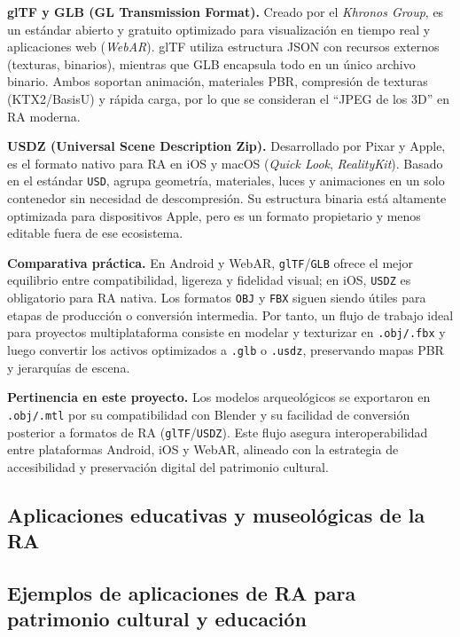 \textbf{glTF y GLB (GL Transmission Format).} Creado por el \emph{Khronos Group}, es un estándar abierto y gratuito optimizado para visualización en tiempo real y aplicaciones web (\emph{WebAR}). glTF utiliza estructura JSON con recursos externos (texturas, binarios), mientras que GLB encapsula todo en un único archivo binario. Ambos soportan animación, materiales \gls{PBR}, compresión de texturas (KTX2/BasisU) y rápida carga, por lo que se consideran el “JPEG de los 3D” en RA moderna.

\textbf{USDZ (Universal Scene Description Zip).} Desarrollado por Pixar y Apple, es el formato nativo para RA en iOS y macOS (\emph{Quick Look}, \emph{RealityKit}). Basado en el estándar \texttt{USD}, agrupa geometría, materiales, luces y animaciones en un solo contenedor sin necesidad de descompresión. Su estructura binaria está altamente optimizada para dispositivos Apple, pero es un formato propietario y menos editable fuera de ese ecosistema.

\textbf{Comparativa práctica.} En Android y WebAR, \texttt{glTF}/\texttt{GLB} ofrece el mejor equilibrio entre compatibilidad, ligereza y fidelidad visual; en iOS, \texttt{USDZ} es obligatorio para RA nativa. Los formatos \texttt{OBJ} y \texttt{FBX} siguen siendo útiles para etapas de producción o conversión intermedia. Por tanto, un flujo de trabajo ideal para proyectos multiplataforma consiste en modelar y texturizar en \texttt{.obj/.fbx} y luego convertir los activos optimizados a \texttt{.glb} o \texttt{.usdz}, preservando mapas \gls{PBR} y jerarquías de escena.

\textbf{Pertinencia en este proyecto.} Los modelos arqueológicos se exportaron en \texttt{.obj/.mtl} por su compatibilidad con Blender y su facilidad de conversión posterior a formatos de RA (\texttt{glTF}/\texttt{USDZ}). Este flujo asegura interoperabilidad entre plataformas Android, iOS y WebAR, alineado con la estrategia de accesibilidad y preservación digital del patrimonio cultural.



\subsection*{Aplicaciones educativas y museológicas de la RA}

\subsection*{Ejemplos de aplicaciones de RA para patrimonio cultural y educación}

